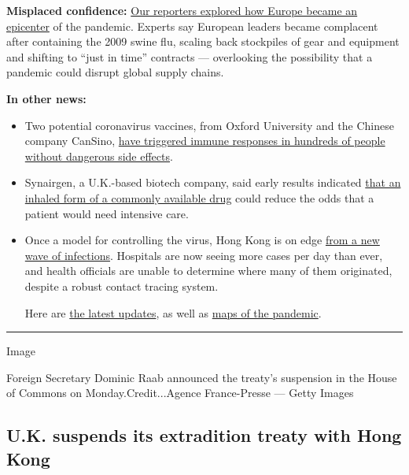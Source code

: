 \textbf{Misplaced confidence:}
\href{https://www.nytimes.com/2020/07/20/world/europe/coronavirus-mistakes-france-uk-italy.html}{Our
reporters explored how Europe became an epicenter} of the pandemic.
Experts say European leaders became complacent after containing the 2009
swine flu, scaling back stockpiles of gear and equipment and shifting to
``just in time'' contracts --- overlooking the possibility that a
pandemic could disrupt global supply chains.

\textbf{In other news:}

\begin{itemize}
\item
  Two potential coronavirus vaccines, from Oxford University and the
  Chinese company CanSino,
  \href{https://www.nytimes.com/2020/07/20/world/coronavirus-updates.html?action=click\&pgtype=Article\&state=default\&module=styln-coronavirus\&variant=show\&region=TOP_BANNER\&context=storylines_menu\#link-76470c34}{have
  triggered immune responses in hundreds of people without dangerous
  side effects}.
\item
  Synairgen, a U.K.-based biotech company, said early results indicated
  \href{https://www.nytimes.com/2020/07/20/world/covid-19-treatment-synairgen-interferon-beta.html}{that
  an inhaled form of a commonly available drug} could reduce the odds
  that a patient would need intensive care.
\item
  Once a model for controlling the virus, Hong Kong is on edge
  \href{https://www.nytimes.com/2020/07/20/world/asia/hong-kong-coronavirus.html}{from
  a new wave of infections}. Hospitals are now seeing more cases per day
  than ever, and health officials are unable to determine where many of
  them originated, despite a robust contact tracing system.

  Here are
  \href{https://www.nytimes.com/2020/07/20/world/coronavirus-updates.html}{the
  latest updates}, as well as
  \href{https://www.nytimes.com/interactive/2020/world/coronavirus-maps.html}{maps
  of the pandemic}.
\end{itemize}

\begin{center}\rule{0.5\linewidth}{\linethickness}\end{center}

Image

Foreign Secretary Dominic Raab announced the treaty's suspension in the
House of Commons on Monday.Credit...Agence France-Presse --- Getty
Images

\hypertarget{uk-suspends-its-extradition-treaty-with-hong-kong}{%
\subsection{U.K. suspends its extradition treaty with Hong
Kong}\label{uk-suspends-its-extradition-treaty-with-hong-kong}}

